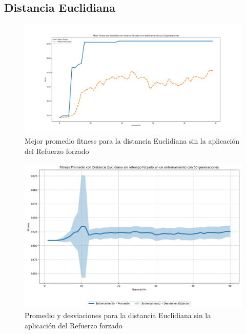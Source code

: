 \documentclass[conference]{IEEEtran}
\begin{document}
\subsection{Distancia Euclidiana}
\setcounter{figure}{0}
\renewcommand{\thefigure}{S\arabic{figure}-EN}
\begin{figure}[H]
    \centering
    \includegraphics[width=0.9 \linewidth]{Sin_Refuerzo_50Gen/Eucli_NoRef_50Gen.png}
    \caption{Mejor promedio fitness para la distancia Euclidiana sin la aplicación del Refuerzo forzado}
    \label{fig:eucli_no_ref_50}
\end{figure}
\begin{figure}[H]
    \centering
    \includegraphics[width=0.9 \linewidth]{Sin_Refuerzo_50Gen/Eucli_NoRef_50Gen_Sombra.png}
    \caption{Promedio y desviaciones para la distancia Euclidiana sin la aplicación del Refuerzo forzado}
    \label{fig:eucli_no_ref_50_sombra}    
\end{figure}
\end{document}

